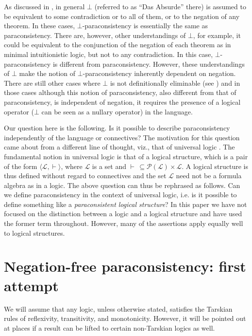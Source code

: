 \documentclass[submission]{eptcs}
\newcommand{\lang}{\mathcal{L}}
\newcommand{\pow}{\mathcal{P}}
\theoremstyle{definition}
\begin{document}
As discussed in \cite{Robles2009}, in general $\bot$ (referred to as ``Das Absurde'' there) is assumed to be equivalent to some contradiction or to all of them, or to the negation of any theorem. In these cases, $\bot$-paraconsistency is essentially the same as paraconsistency. There are, however, other understandings of $\bot$, for example, it could be equivalent to the conjunction of the negation of each theorem as in minimal intuitionistic logic, but not to any contradiction. In this case, $\bot$-paraconsistency is different from paraconsistency. However, these understandings of $\bot$ make the notion of $\bot$-paraconsistency inherently dependent on negation. There are still other cases where $\bot$ is not definitionally eliminable (see \cite{RoblesMendez2008}) and in those cases although this notion of paraconsistency, also different from that of paraconsistency, is independent of negation, it requires the presence of a logical operator ($\bot$ can be seen as a nullary operator) in the language.

Our question here is the following. Is it possible to describe paraconsistency independently of the language or connectives? The motivation for this question came about from a different line of thought, viz., that of universal logic \cite{Beziau1994,Beziau2006}. The fundamental notion in universal logic is that of a logical structure, which is a pair of the form $\langle\lang,\vdash\rangle$, where $\lang$ is a set and $\vdash\,\subseteq\pow(\lang)\times\lang$. A logical structure is thus defined without regard to connectives and the set $\lang$ need not be a formula algebra as in a logic. The above question can thus be rephrased as follows. Can we define paraconsistency in the context of universal logic, i.e. is it possible to define something like a \emph{paraconsistent logical structure}? In this paper we have not focused on the distinction between a logic and a logical structure and have used the former term throughout. However, many of the assertions apply equally well to logical structures.

\section{Negation-free paraconsistency: first attempt}
We will assume that any logic, unless otherwise stated, satisfies the Tarskian rules of reflexivity, transitivity, and monotonicity. However, it will be pointed out at places if a result can be lifted to certain non-Tarskian logics as well.
\end{document}
